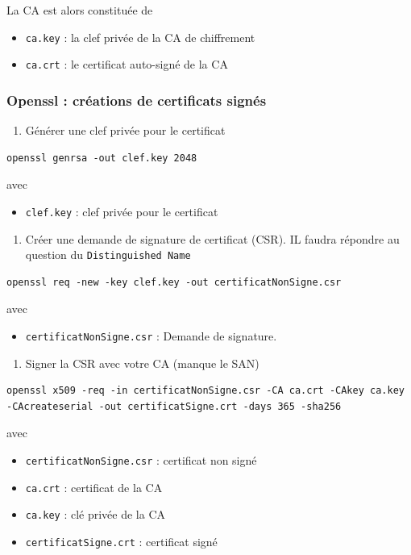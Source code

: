\documentclass[french, 12pt]{article}%
\newcommand{\itemE}{\item[$\bullet$]}
\begin{document}
\vspace{0.5cm}
La CA est alors constituée de
\begin{itemize}
\itemE \verb?ca.key? : la clef privée de la CA de chiffrement
\itemE \verb?ca.crt? : le certificat auto-signé de la CA 
\end{itemize}


\subsubsection{Openssl : créations de certificats signés}


\begin{enumerate}
\item  Générer une clef privée pour le certificat
\end{enumerate}
\begin{lstlisting}[style=commande]
openssl genrsa -out clef.key 2048
\end{lstlisting}
avec 
\begin{itemize}
\itemE \verb?clef.key? : clef privée pour le certificat
\end{itemize}

\begin{enumerate}[resume]
\item Créer une demande de signature de certificat (CSR). IL faudra répondre au question du \verb?Distinguished Name?
\end{enumerate}
\begin{lstlisting}[style=commande]
openssl req -new -key clef.key -out certificatNonSigne.csr
\end{lstlisting}
avec 
\begin{itemize}
\itemE \verb?certificatNonSigne.csr? : Demande de signature. 
\end{itemize}


\begin{enumerate}[resume]
\item Signer la CSR avec votre CA (manque le SAN)
\end{enumerate}
\begin{lstlisting}[style=commande]
openssl x509 -req -in certificatNonSigne.csr -CA ca.crt -CAkey ca.key -CAcreateserial -out certificatSigne.crt -days 365 -sha256
\end{lstlisting}
avec 
\begin{itemize}
\itemE \verb?certificatNonSigne.csr? : certificat non signé
\itemE \verb?ca.crt? : certificat de la CA
\itemE \verb?ca.key? : clé privée de la CA
\itemE \verb?certificatSigne.crt? : certificat signé
\end{itemize}
\end{document}
